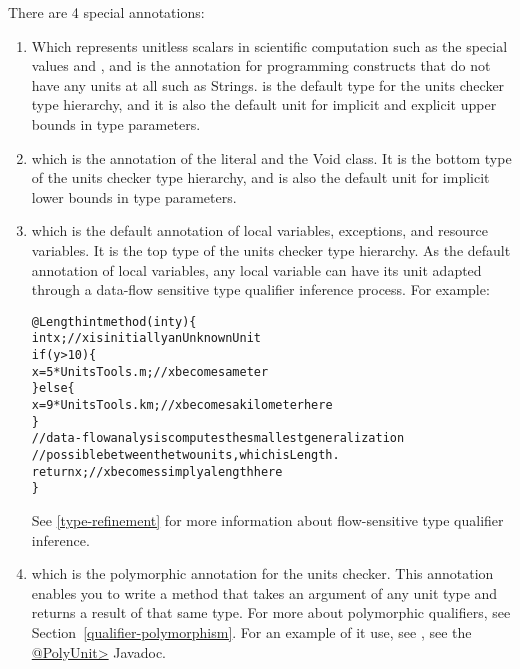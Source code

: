 There are 4 special annotations:
\begin{enumerate}
\item {}
  Which represents unitless scalars in scientific computation such as the special
  values  and , and is the annotation for programming constructs
  that do not have any units at all such as Strings.  is the
  default type for the units checker type hierarchy, and it is also the default
  unit for implicit and explicit upper bounds in type parameters.

\item {}
  which is the annotation of the  literal and the Void class. It is
  the bottom type of the units checker type hierarchy, and is also the default
  unit for implicit lower bounds in type parameters.

\item {}
  which is the default annotation of local variables, exceptions, and resource
  variables. It is the top type of the units checker type hierarchy.
  As the default annotation of local variables, any local variable can have its
  unit adapted through a data-flow sensitive type qualifier inference process.
  For example:

\begin{alltt}
@Length int method(int y) \{
  int x;                   // x is initially an UnknownUnit
  if (y > 10) \{
    x = 5 * UnitsTools.m;  // x becomes a meter
  \} else \{
    x = 9 * UnitsTools.km; // x becomes a kilometer here
  \}
  // data-flow analysis computes the smallest generalization
  // possible between the two units, which is Length.
  return x;                // x becomes simply a length here
\}
\end{alltt}

See \ref{type-refinement} for more information about flow-sensitive type qualifier inference.

\item {}
  which is the polymorphic annotation for the units checker. This annotation
  enables you to write a method that takes an argument of any unit type and
  returns a result of that same type. For more about polymorphic qualifiers,
  see Section~\ref{qualifier-polymorphism}. For an example of it use, see
  , see the
  \href{api/org/checkerframework/checker/units/qual/PolyUnit.html}{\<@PolyUnit>} Javadoc.

\end{enumerate}

